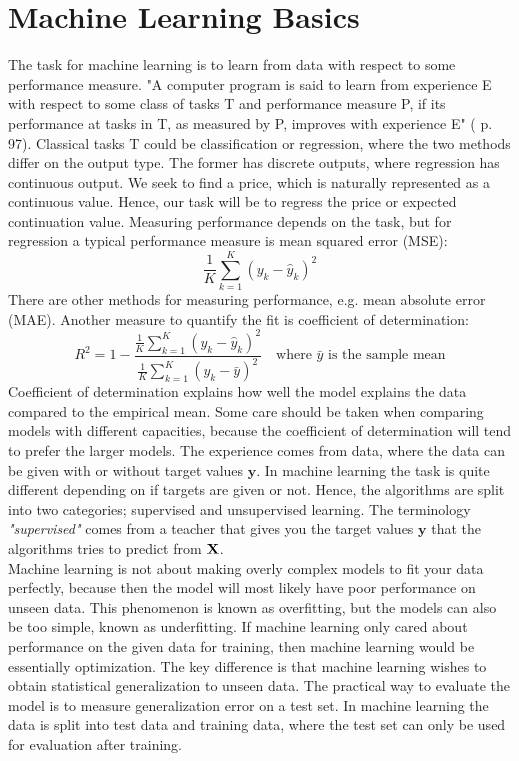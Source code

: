 \section{Machine Learning Basics}
The task for machine learning is to learn from data with respect to some performance measure. "A computer program is said to learn from experience E with respect to some class of tasks T and performance measure P, if its performance at tasks in T, as measured by P, improves with experience E" (\parencite{Goodfellow-et-al-2016} p. 97). Classical tasks T could be classification or regression, where the two methods differ on the output type. The former has discrete outputs, where regression has continuous output. We seek to find a price, which is naturally represented as a continuous value. Hence, our task will be to regress the price or expected continuation value. Measuring performance depends on the task, but for regression a typical performance measure is mean squared error (MSE):
$$\frac{1}{K}\sum_{k=1}^{K} (y_k-\hat{y}_k)^2$$
There are other methods for measuring performance, e.g. mean absolute error (MAE). Another measure to quantify the fit is coefficient of determination:
$$R^2=1-\frac{\frac{1}{K}\sum_{k=1}^{K} (y_k-\hat{y}_k)^2}{\frac{1}{K}\sum_{k=1}^{K} (y_k-\bar{y})^2} \quad \text{where $\bar{y}$ is the sample mean}$$
Coefficient of determination explains how well the model explains the data compared to the empirical mean. Some care should be taken when comparing models with different capacities, because the coefficient of determination will tend to prefer the larger models. The experience comes from data, where the data can be given with or without target values $\bm{y}$. In machine learning the task is quite different depending on if targets are given or not. Hence, the algorithms are split into two categories; supervised and unsupervised learning. The terminology \textsl{"supervised"} comes from a teacher that gives you the target values $\bm{y}$ that the algorithms tries to predict from $\mathbf{X}$.\\

Machine learning is not about making overly complex models to fit your data perfectly, because then the model will most likely have poor performance on unseen data. This phenomenon is known as overfitting, but the models can also be too simple, known as underfitting. If machine learning only cared about performance on the given data for training, then machine learning would be essentially optimization. The key difference is that machine learning wishes to obtain statistical generalization to unseen data. The practical way to evaluate the model is to measure generalization error on a test set. In machine learning the data is split into test data and training data, where the test set can only be used for evaluation after training. \\

